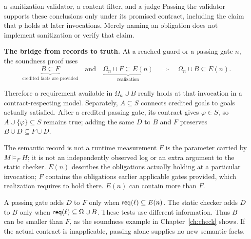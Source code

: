 \begin{example}{a sanitization validator, a content filter, and a judge}
Passing the validator supports these conclusions only under its promised contract, including the claim that $p$ holds at later invocations. Merely naming an obligation  does not implement sanitization or verify that claim.
\end{example}

\begin{samepage}
\textbf{The bridge from records to truth.} At a reached guard or a passing gate $n$, the soundness proof uses
\[
\underbrace{B\subseteq F}_{\text{credited facts are provided}}
\quad\text{and}\quad
\underbrace{\Omega_n\cup F\subseteq E(n)}_{\text{realization}}
\quad\Longrightarrow\quad
\Omega_n\cup B\subseteq E(n).
\]
\end{samepage}
Therefore a requirement available in $\Omega_n\cup B$ really holds at that invocation in a contract-respecting model. Separately, $A\subseteq S$ connects credited goals to goals actually satisfied. After a credited passing gate, its contract gives $\varphi\in S$, so $A\cup\{\varphi\}\subseteq S$ remains true; adding the same $D$ to $B$ and $F$ preserves $B\cup D\subseteq F\cup D$.

\begin{warning}{The semantic record is not a runtime measurement}
$F$ is the parameter carried by $M\models_F H$; it is not an independently observed log or an extra argument to the static checker. $E(n)$ describes the obligations actually holding at a particular invocation; $F$ contains the obligations earlier applicable gates provided, which realization requires to hold there. $E(n)$ can contain more than $F$.

A passing gate adds $D$ to $F$ only when $\mathsf{req}(\ell)\subseteq E(n)$. The static checker adds $D$ to $B$ only when $\mathsf{req}(\ell)\subseteq\Omega\cup B$. These tests use different information. Thus $B$ can be smaller than $F$, as the soundness example in Chapter~\ref{ch:check} shows. If the actual contract is inapplicable, passing alone supplies no new semantic facts.
\end{warning}


